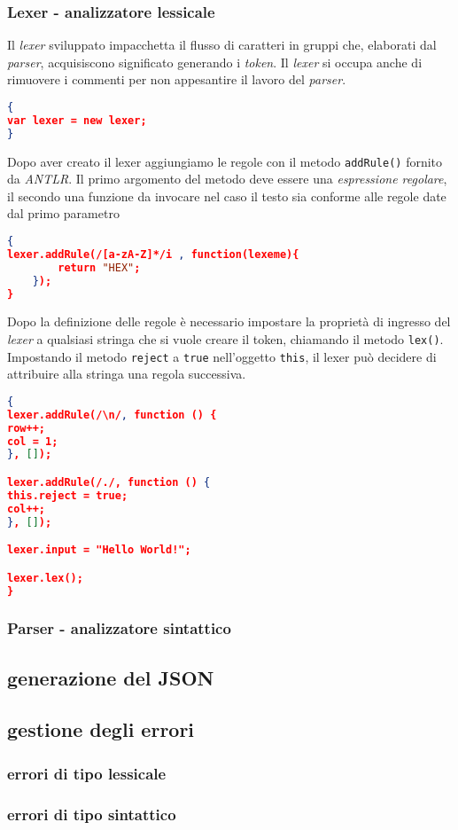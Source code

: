 \subsubsection{Lexer - analizzatore lessicale}
Il \textit{lexer} sviluppato impacchetta il flusso di caratteri in gruppi che, elaborati dal \textit{parser}, acquisiscono significato generando i \textit{token}. Il \textit{lexer} si occupa anche di rimuovere i commenti per non appesantire il lavoro del \textit{parser}.
\begin{lstlisting}[language=json,firstnumber=1]
{
var lexer = new lexer;
}
\end{lstlisting}
Dopo aver creato il lexer aggiungiamo le regole con il metodo \texttt{addRule()} fornito da \textit{ANTLR}. Il primo argomento del metodo deve essere una \textit{espressione regolare}, il secondo una funzione da invocare nel caso il testo sia conforme alle regole date dal primo parametro
\begin{lstlisting}[language=json,firstnumber=1]
{
lexer.addRule(/[a-zA-Z]*/i , function(lexeme){
		return "HEX";
	});
}
\end{lstlisting}
Dopo la definizione delle regole è necessario impostare la proprietà di ingresso del \textit{lexer} a qualsiasi stringa che si vuole creare il token, chiamando il metodo \texttt{lex()}. Impostando il metodo \texttt{reject} a \texttt{true} nell'oggetto \texttt{this}, il lexer può decidere di attribuire alla stringa una regola successiva.
\begin{lstlisting}[language=json,firstnumber=1]
{
lexer.addRule(/\n/, function () {
row++;
col = 1;
}, []);

lexer.addRule(/./, function () {
this.reject = true;
col++;
}, []);

lexer.input = "Hello World!";

lexer.lex();
}
\end{lstlisting}

\subsubsection{Parser - analizzatore sintattico}
\subsection{generazione del JSON}
\subsection{gestione degli errori}
\subsubsection{errori di tipo lessicale}
\subsubsection{errori di tipo sintattico}